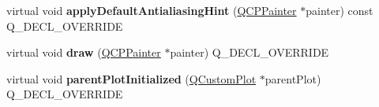 \begin{DoxyCompactItemize}
virtual void {\bfseries apply\+Default\+Antialiasing\+Hint} (\hyperlink{class_q_c_p_painter}{Q\+C\+P\+Painter} $\ast$painter) const Q\+\_\+\+D\+E\+C\+L\+\_\+\+O\+V\+E\+R\+R\+I\+DE
\item 
\mbox{\label{class_q_c_p_layout_element_ad1c597b1d608cfdd86e7b76819a94cfb}} 
virtual void {\bfseries draw} (\hyperlink{class_q_c_p_painter}{Q\+C\+P\+Painter} $\ast$painter) Q\+\_\+\+D\+E\+C\+L\+\_\+\+O\+V\+E\+R\+R\+I\+DE
\item 
\mbox{\label{class_q_c_p_layout_element_aa4e9a1488b6929588829846a46243dc6}} 
virtual void {\bfseries parent\+Plot\+Initialized} (\hyperlink{class_q_custom_plot}{Q\+Custom\+Plot} $\ast$parent\+Plot) Q\+\_\+\+D\+E\+C\+L\+\_\+\+O\+V\+E\+R\+R\+I\+DE
\end{DoxyCompactItemize}
